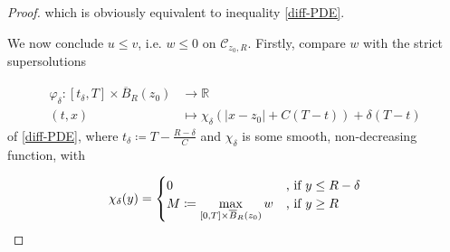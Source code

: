 \begin{theorem}
\begin{proof}
				which is obviously equivalent to inequality \eqref{diff-PDE}.
				
				We now conclude $ u \leq v $, i.e. $ w \leq 0 $ on $ \mathcal{C}_{z_0, R} $. Firstly, compare $ w $ with the strict supersolutions 
				
				\begin{align*}
				\varphi_{\delta} : \left[ t_{\delta}, T \right] \times \overline{B}_R (z_0) &\to \mathbb{R} \\
				(t, x) &\mapsto \chi_{\delta} \left( \lvert x - z_0 \rvert + C(T - t) \right) + \delta (T - t)
				\end{align*}
				of \eqref{diff-PDE}, where $ t_{\delta} \coloneqq T - \frac{R - \delta}{C} $ and $ \chi_{\delta} $ is some smooth, non-decreasing function, with
				
				\begin{align*}
					\chi_{\delta}(y) = \begin{cases}
					0 &\hbox{, if } y \leq R - \delta \\
					M \coloneqq \max\limits_{\left[0, T\right] \times \overline{B}_R (z_0)} w &\hbox{, if }y \geq R
					\end{cases}
				\end{align*}
				

\end{proof}
\end{theorem}
